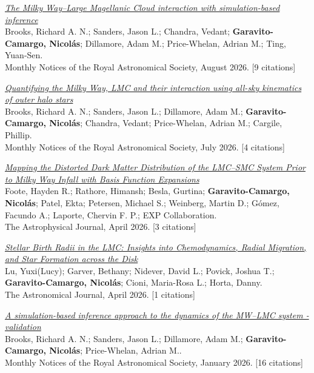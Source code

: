 \documentclass[14pt]{article}
\begin{document}
\begin{etaremune}
\item \textit{\href{https://ui.adsabs.harvard.edu/abs/2026MNRAS.550g1254B/abstract}{The Milky Way--Large Magellanic Cloud interaction with simulation-based inference}}\\
  {\small \color{darkgray} Brooks, Richard A. N.; Sanders, Jason L.; Chandra, Vedant; \textbf{Garavito-Camargo, Nicolás}; Dillamore, Adam M.; Price-Whelan, Adrian M.; Ting, Yuan-Sen.\\
  Monthly Notices of the Royal Astronomical Society, August 2026. [9 citations]}

\item \textit{\href{https://ui.adsabs.harvard.edu/abs/2026MNRAS.549ag926B/abstract}{Quantifying the Milky Way, LMC and their interaction using all-sky kinematics of outer halo stars}}\\
  {\small \color{darkgray} Brooks, Richard A. N.; Sanders, Jason L.; Dillamore, Adam M.; \textbf{Garavito-Camargo, Nicolás}; Chandra, Vedant; Price-Whelan, Adrian M.; Cargile, Phillip.\\
  Monthly Notices of the Royal Astronomical Society, July 2026. [4 citations]}

\item \textit{\href{https://ui.adsabs.harvard.edu/abs/2026ApJ..1001...37F/abstract}{Mapping the Distorted Dark Matter Distribution of the LMC--SMC System Prior to Milky Way Infall with Basis Function Expansions}}\\
  {\small \color{darkgray} Foote, Hayden R.; Rathore, Himansh; Besla, Gurtina; \textbf{Garavito-Camargo, Nicolás}; Patel, Ekta; Petersen, Michael S.; Weinberg, Martin D.; Gómez, Facundo A.; Laporte, Chervin F. P.; EXP Collaboration.\\
  The Astrophysical Journal, April 2026. [3 citations]}

\item \textit{\href{https://ui.adsabs.harvard.edu/abs/2026AJ....171..230L/abstract}{Stellar Birth Radii in the LMC: Insights into Chemodynamics, Radial Migration, and Star Formation across the Disk}}\\
  {\small \color{darkgray} Lu, Yuxi(Lucy); Garver, Bethany; Nidever, David L.; Povick, Joshua T.; \textbf{Garavito-Camargo, Nicolás}; Cioni, Maria-Rosa L.; Horta, Danny.\\
  The Astronomical Journal, April 2026. [1 citations]}

\item \textit{\href{https://ui.adsabs.harvard.edu/abs/2026MNRAS.545f2111B/abstract}{A simulation-based inference approach to the dynamics of the MW--LMC system - validation}}\\
  {\small \color{darkgray} Brooks, Richard A. N.; Sanders, Jason L.; Dillamore, Adam M.; \textbf{Garavito-Camargo, Nicolás}; Price-Whelan, Adrian M..\\
  Monthly Notices of the Royal Astronomical Society, January 2026. [16 citations]}


\end{etaremune}
\end{document}
